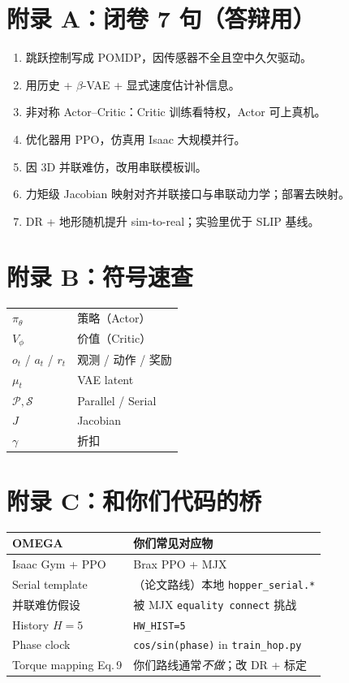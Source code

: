 \documentclass[11pt,a4paper]{article}
\begin{document}
\section*{附录 A：闭卷 7 句（答辩用）}

\begin{enumerate}
  \item 跳跃控制写成 POMDP，因传感器不全且空中久欠驱动。
  \item 用历史 + $\beta$-VAE + 显式速度估计补信息。
  \item 非对称 Actor--Critic：Critic 训练看特权，Actor 可上真机。
  \item 优化器用 PPO，仿真用 Isaac 大规模并行。
  \item 因 3D 并联难仿，改用串联模板训。
  \item 力矩级 Jacobian 映射对齐并联接口与串联动力学；部署去映射。
  \item DR + 地形随机提升 sim-to-real；实验里优于 SLIP 基线。
\end{enumerate}

\section*{附录 B：符号速查}

\begin{tabular}{@{}ll@{}}
$\pi_\theta$ & 策略（Actor）\\
$V_\phi$ & 价值（Critic）\\
$o_t$ / $a_t$ / $r_t$ & 观测 / 动作 / 奖励\\
$\mu_t$ & VAE latent\\
$\mathcal{P},\mathcal{S}$ & Parallel / Serial\\
$J$ & Jacobian\\
$\gamma$ & 折扣\\
\end{tabular}

\section*{附录 C：和你们代码的桥}

\begin{tabular}{@{}p{4.5cm}p{9cm}@{}}
\hline
OMEGA & 你们常见对应物 \\
\hline
Isaac Gym + PPO & Brax PPO + MJX \\
Serial template & （论文路线）本地 \texttt{hopper\_serial.*} \\
并联难仿假设 & 被 MJX \texttt{equality connect} 挑战 \\
History $H=5$ & \texttt{HW\_HIST=5}\\
Phase clock & \texttt{cos/sin(phase)} in \texttt{train\_hop.py}\\
Torque mapping Eq.\,9 & 你们路线通常\emph{不做}；改 DR + 标定 \\
\hline
\end{tabular}
\end{document}
